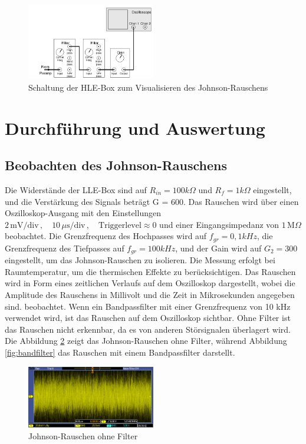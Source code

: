 \FloatBarrier
\begin{figure}[htbp]
    \centering
    \includegraphics[width=0.5\textwidth]{figs/johnson hle.png}
    \caption{Schaltung der HLE-Box zum Visualisieren des Johnson-Rauschens \cite{praktikum}}
    \label{fig:johnson hle}
\end{figure}
\FloatBarrier
\section{Durchführung und Auswertung}
\subsection{Beobachten des Johnson-Rauschens}
Die Widerstände der LLE-Box sind auf $R_{in} = 100 k\Omega$  und $R_f = 1 k\Omega$ eingestellt, und die Verstärkung des Signals beträgt G = 600. Das Rauschen wird über einen Oszilloskop-Ausgang mit den Einstellungen $2\,\text{mV/div} \,, \quad 10\,\mu\text{s/div} \,, \quad \text{Triggerlevel} \approx 0$ und einer Eingangsimpedanz von $1\,\text{M}\Omega$ beobachtet. Die Grenzfrequenz des Hochpasses wird auf $f_{gr} = 0,1 kHz$, die Grenzfrequenz des Tiefpasses auf $f_{gr} = 100 kHz$, und der Gain wird auf $G_2 = 300$ eingestellt, um das Johnson-Rauschen zu isolieren. Die Messung erfolgt bei Raumtemperatur, um die thermischen Effekte zu berücksichtigen. Das Rauschen wird in Form eines zeitlichen Verlaufs auf dem Oszilloskop dargestellt, wobei die Amplitude des Rauschens in Millivolt und die Zeit in Mikrosekunden angegeben sind.
 beobachtet. Wenn ein Bandpassfilter mit einer Grenzfrequenz von 10 kHz verwendet wird, ist das Rauschen auf dem Oszilloskop sichtbar. Ohne Filter ist das Rauschen nicht erkennbar, da es von anderen Störsignalen überlagert wird. Die Abbildung \ref{fig:johnson noise} zeigt das Johnson-Rauschen ohne Filter, während Abbildung \ref{fig:bandfilter} das Rauschen mit einem Bandpassfilter darstellt.
 \FloatBarrier
\begin{figure}[htbp]
    \centering
    \includegraphics[width=0.5\textwidth]{figs/johnson_noise_without_filter.png}
    \caption{Johnson-Rauschen ohne Filter}
    \label{fig:johnson noise}
\end{figure}
\FloatBarrier

